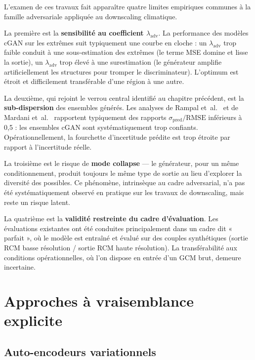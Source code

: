 \documentclass[14pt,a4paper,openany]{extreport}
\theoremstyle{definition}
\begin{document}
L'examen de ces travaux fait apparaître quatre limites empiriques communes à la famille adversariale appliquée au downscaling climatique.

La première est la \textbf{sensibilité au coefficient $\lambda_{\mathrm{adv}}$}. La performance des modèles cGAN sur les extrêmes suit typiquement une courbe en cloche : un $\lambda_{\mathrm{adv}}$ trop faible conduit à une sous-estimation des extrêmes (le terme MSE domine et lisse la sortie), un $\lambda_{\mathrm{adv}}$ trop élevé à une surestimation (le générateur amplifie artificiellement les structures pour tromper le discriminateur). L'optimum est étroit et difficilement transférable d'une région à une autre.

La deuxième, qui rejoint le verrou central identifié au chapitre précédent, est la \textbf{sub-dispersion} des ensembles générés. Les analyses de Rampal et~al.~\cite{rampal_cgan_2024} et de Mardani et~al.~\cite{mardani_corrdiff_2023} rapportent typiquement des rapports $\sigma_{\mathrm{pred}}/\mathrm{RMSE}$ inférieurs à 0,5 : les ensembles cGAN sont systématiquement trop confiants. Opérationnellement, la fourchette d'incertitude prédite est trop étroite par rapport à l'incertitude réelle.

La troisième est le risque de \textbf{mode collapse} --- le générateur, pour un même conditionnement, produit toujours le même type de sortie au lieu d'explorer la diversité des possibles. Ce phénomène, intrinsèque au cadre adversarial, n'a pas été systématiquement observé en pratique sur les travaux de downscaling, mais reste un risque latent.

La quatrième est la \textbf{validité restreinte du cadre d'évaluation}. Les évaluations existantes ont été conduites principalement dans un cadre dit « parfait », où le modèle est entraîné et évalué sur des couples synthétiques (sortie RCM basse résolution / sortie RCM haute résolution). La transférabilité aux conditions opérationnelles, où l'on dispose en entrée d'un GCM brut, demeure incertaine.

\section{Approches à vraisemblance explicite}
\label{sec:soa-vrai}

\subsection{Auto-encodeurs variationnels}
\label{ssec:soa-vae}
\end{document}
